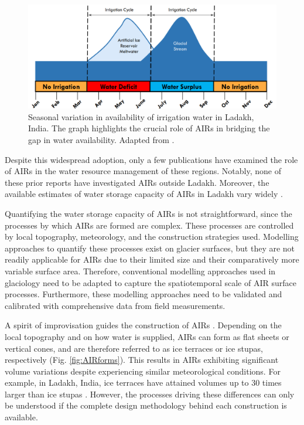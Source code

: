 \begin{figure}[htb] \centering \includegraphics[width=\textwidth]{figs/irrigation_cycles.png}
	\caption{Seasonal variation in availability of irrigation water in Ladakh, India. The graph highlights the
		crucial role of \ac{AIRs} in bridging the gap in water availability. Adapted from
		\citet{nusserLocalKnowledgeGlobal2016}.} \label{fig:irrigation_cycles} \end{figure}


Despite this widespread adoption, only a few publications have examined the role of \ac{AIRs} in the water resource
management of these regions. Notably, none of these prior reports have investigated \ac{AIRs} outside Ladakh.
Moreover, the available estimates of water storage capacity of \ac{AIRs} in Ladakh vary widely
\citep{norphelSnowWaterHarvesting2015, baglaArtificialGlaciersHelp1998}.

Quantifying the water storage capacity of \ac{AIRs} is not straightforward, since the processes by which
\ac{AIRs} are formed are complex. These processes are controlled by local topography, meteorology, and the
construction strategies used. Modelling approaches to quantify these processes exist on glacier surfaces, but
they are not readily applicable for \ac{AIRs} due to their limited size and their comparatively more variable surface
area. Therefore, conventional modelling approaches used in glaciology need to be adapted to capture the
spatiotemporal scale of \ac{AIR} surface processes. Furthermore, these modelling approaches need to be validated and
calibrated with comprehensive data from field measurements.

A spirit of improvisation guides the construction of \ac{AIRs} \citep{clouseLadakhArtificialGlaciers2017}.
Depending on the local topography and on how water is supplied, \ac{AIRs} can form as flat sheets or vertical
cones, and are therefore referred to as ice terraces or ice stupas, respectively (Fig. \ref{fig:AIRforms}). This
results in \ac{AIRs} exhibiting significant volume variations despite experiencing similar
meteorological conditions. For example, in Ladakh, India, ice terraces have attained volumes up to 30 times
larger than ice stupas \citep{nusserSociohydrologyArtificialGlaciers2019}. However, the processes driving these
differences can only be understood if the complete design methodology behind each construction is available.

